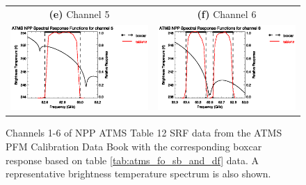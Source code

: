\begin{figure}[H]
\begin{tabular}{c c}
    \textsf{\textbf{(e)} Channel 5} &
    \textsf{\textbf{(f)} Channel 6} \\
    \includegraphics[bb=70 400 300 559,clip,scale=1.0]{graphics/srf/table12/atms_npp.ch5.osrf.eps} &
    \includegraphics[bb=70 400 300 559,clip,scale=1.0]{graphics/srf/table12/atms_npp.ch6.osrf.eps}
  \end{tabular}
  \caption{Channels 1-6 of NPP ATMS Table 12 SRF data from the ATMS PFM Calibration Data Book\cite{ATMS_PFM_CalLog} with the corresponding boxcar response based on table \ref{tab:atms_fo_sb_and_df} data. A representative brightness temperature spectrum is also shown.}
  \label{fig:atms_npp.table12.ch1-6.osrf}
\end{figure}

